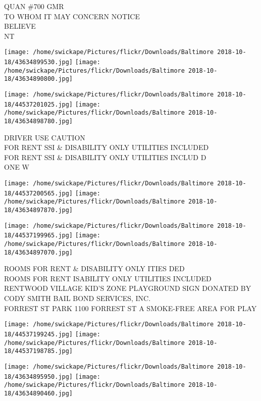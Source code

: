 \documentclass[10pt,letterpaper]{article}
\begin{document}
QUAN \#700 GMR\\
TO WHOM IT MAY CONCERN NOTICE\\
BELIEVE\\
NT\\
\pagebreak

\texttt{[image: /home/swickape/Pictures/flickr/Downloads/Baltimore 2018-10-18/43634899530.jpg]}
\texttt{[image: /home/swickape/Pictures/flickr/Downloads/Baltimore 2018-10-18/43634890800.jpg]}

\texttt{[image: /home/swickape/Pictures/flickr/Downloads/Baltimore 2018-10-18/44537201025.jpg]}
\texttt{[image: /home/swickape/Pictures/flickr/Downloads/Baltimore 2018-10-18/43634898780.jpg]}

DRIVER USE CAUTION\\
FOR RENT SSI \& DISABILITY ONLY UTILITIES INCLUDED\\
FOR RENT SSI \& DISABILITY ONLY UTILITIES INCLUD D\\
ONE W\\
\pagebreak

\texttt{[image: /home/swickape/Pictures/flickr/Downloads/Baltimore 2018-10-18/44537200565.jpg]}
\texttt{[image: /home/swickape/Pictures/flickr/Downloads/Baltimore 2018-10-18/43634897870.jpg]}

\texttt{[image: /home/swickape/Pictures/flickr/Downloads/Baltimore 2018-10-18/44537199965.jpg]}
\texttt{[image: /home/swickape/Pictures/flickr/Downloads/Baltimore 2018-10-18/43634897070.jpg]}

ROOMS FOR RENT \& DISABILITY ONLY ITIES DED\\
ROOMS FOR RENT ISABILITY ONLY UTILITIES INCLUDED\\
RENTWOOD VILLAGE KID'S ZONE PLAYGROUND SIGN DONATED BY CODY SMITH BAIL BOND SERVICES, INC.\\
FORREST ST PARK 1100 FORREST ST A SMOKE{-}FREE AREA FOR PLAY\\
\pagebreak

\texttt{[image: /home/swickape/Pictures/flickr/Downloads/Baltimore 2018-10-18/44537199245.jpg]}
\texttt{[image: /home/swickape/Pictures/flickr/Downloads/Baltimore 2018-10-18/44537198785.jpg]}

\texttt{[image: /home/swickape/Pictures/flickr/Downloads/Baltimore 2018-10-18/43634895950.jpg]}
\texttt{[image: /home/swickape/Pictures/flickr/Downloads/Baltimore 2018-10-18/43634890460.jpg]}
\end{document}
